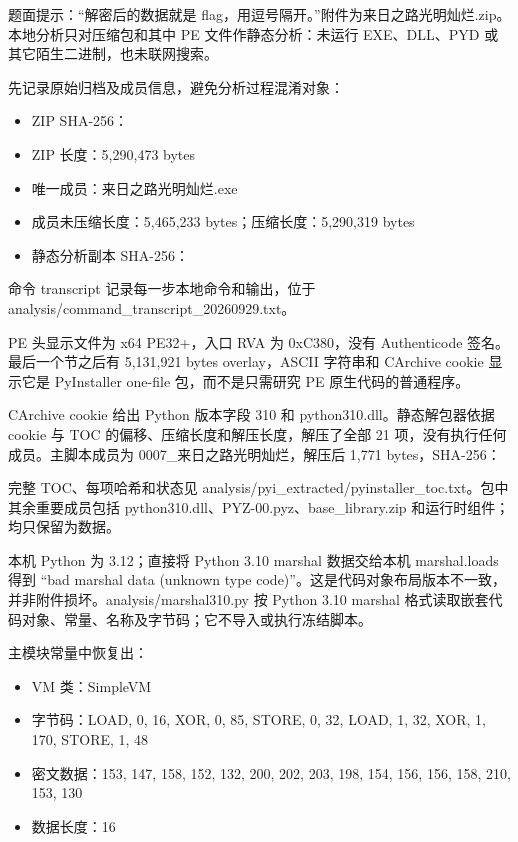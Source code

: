 题面提示：``解密后的数据就是 flag，用逗号隔开。''附件为来日之路光明灿烂.zip。本地分析只对压缩包和其中 PE 文件作静态分析：未运行 EXE、DLL、PYD 或其它陌生二进制，也未联网搜索。

先记录原始归档及成员信息，避免分析过程混淆对象：

\begin{itemize}
\tightlist
\item
  ZIP SHA-256：
\item
  ZIP 长度：5,290,473 bytes
\item
  唯一成员：来日之路光明灿烂.exe
\item
  成员未压缩长度：5,465,233 bytes；压缩长度：5,290,319 bytes
\item
  静态分析副本 SHA-256：
\end{itemize}

命令 transcript 记录每一步本地命令和输出，位于 analysis/command\_transcript\_20260929.txt。

PE 头显示文件为 x64 PE32+，入口 RVA 为 0xC380，没有 Authenticode 签名。最后一个节之后有 5,131,921 bytes overlay，ASCII 字符串和 CArchive cookie 显示它是 PyInstaller one-file 包，而不是只需研究 PE 原生代码的普通程序。

CArchive cookie 给出 Python 版本字段 310 和 python310.dll。静态解包器依据 cookie 与 TOC 的偏移、压缩长度和解压长度，解压了全部 21 项，没有执行任何成员。主脚本成员为 0007\_来日之路光明灿烂，解压后 1,771 bytes，SHA-256：


完整 TOC、每项哈希和状态见 analysis/pyi\_extracted/pyinstaller\_toc.txt。包中其余重要成员包括 python310.dll、PYZ-00.pyz、base\_library.zip 和运行时组件；均只保留为数据。

本机 Python 为 3.12；直接将 Python 3.10 marshal 数据交给本机 marshal.loads 得到 ``bad marshal data (unknown type code)''。这是代码对象布局版本不一致，并非附件损坏。analysis/marshal310.py 按 Python 3.10 marshal 格式读取嵌套代码对象、常量、名称及字节码；它不导入或执行冻结脚本。

主模块常量中恢复出：

\begin{itemize}
\tightlist
\item
  VM 类：SimpleVM
\item
  字节码：LOAD, 0, 16, XOR, 0, 85, STORE, 0, 32, LOAD, 1, 32, XOR, 1, 170, STORE, 1, 48
\item
  密文数据：153, 147, 158, 152, 132, 200, 202, 203, 198, 154, 156, 156, 158, 210, 153, 130
\item
  数据长度：16
\end{itemize}

